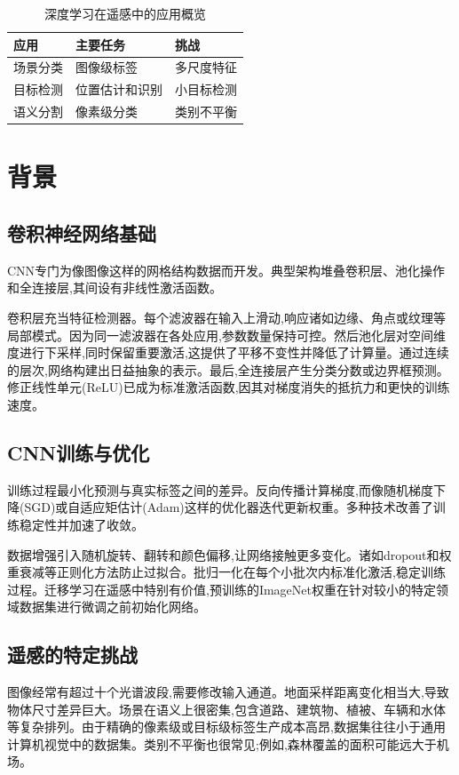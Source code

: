 \documentclass[12pt,a4paper]{article}
\begin{document}
\begin{table}[htbp]
\centering
\caption{深度学习在遥感中的应用概览}
\label{tab:applications}
\begin{tabular}{@{}lll@{}}
\toprule
\textbf{应用} & \textbf{主要任务} & \textbf{挑战} \\
\midrule
场景分类 & 图像级标签 & 多尺度特征 \\
目标检测 & 位置估计和识别 & 小目标检测 \\
语义分割 & 像素级分类 & 类别不平衡 \\
\bottomrule
\end{tabular}
\end{table}

\section{背景}
\label{sec:background}
\subsection{卷积神经网络基础}
CNN专门为像图像这样的网格结构数据而开发。典型架构堆叠卷积层、池化操作和全连接层,其间设有非线性激活函数。

卷积层充当特征检测器。每个滤波器在输入上滑动,响应诸如边缘、角点或纹理等局部模式。因为同一滤波器在各处应用,参数数量保持可控。然后池化层对空间维度进行下采样,同时保留重要激活,这提供了平移不变性并降低了计算量。通过连续的层次,网络构建出日益抽象的表示。最后,全连接层产生分类分数或边界框预测。修正线性单元(ReLU)已成为标准激活函数,因其对梯度消失的抵抗力和更快的训练速度。

\subsection{CNN训练与优化}
训练过程最小化预测与真实标签之间的差异。反向传播计算梯度,而像随机梯度下降(SGD)或自适应矩估计(Adam)这样的优化器迭代更新权重。多种技术改善了训练稳定性并加速了收敛。

数据增强引入随机旋转、翻转和颜色偏移,让网络接触更多变化。诸如dropout和权重衰减等正则化方法防止过拟合。批归一化在每个小批次内标准化激活,稳定训练过程。迁移学习在遥感中特别有价值,预训练的ImageNet权重在针对较小的特定领域数据集进行微调之前初始化网络。

\subsection{遥感的特定挑战}
图像经常有超过十个光谱波段,需要修改输入通道。地面采样距离变化相当大,导致物体尺寸差异巨大。场景在语义上很密集,包含道路、建筑物、植被、车辆和水体等复杂排列。由于精确的像素级或目标级标签生产成本高昂,数据集往往小于通用计算机视觉中的数据集。类别不平衡也很常见;例如,森林覆盖的面积可能远大于机场。
\end{document}
